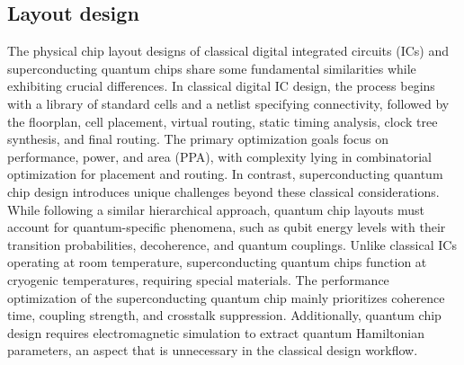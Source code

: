 \documentclass[a4paper,onecolumn,11pt,unpublished]{quantumarticle}
\begin{document}
\subsection{Layout design}
The physical chip layout designs of classical digital integrated circuits (ICs) and superconducting quantum chips share some fundamental similarities while exhibiting crucial differences. In classical digital IC design, the process begins with a library of standard cells and a netlist specifying connectivity, followed by the floorplan, cell placement, virtual routing, static timing analysis, clock tree synthesis, and final routing. The primary optimization goals focus on performance, power, and area (PPA), with complexity lying in combinatorial optimization for placement and routing. In contrast, superconducting quantum chip design introduces unique challenges beyond these classical considerations. While following a similar hierarchical approach, quantum chip layouts must account for quantum-specific phenomena, such as qubit energy levels with their transition probabilities, decoherence, and quantum couplings. Unlike classical ICs operating at room temperature, superconducting quantum chips function at cryogenic temperatures, requiring special materials. The performance optimization of the superconducting quantum chip mainly prioritizes coherence time, coupling strength, and crosstalk suppression. Additionally, quantum chip design requires electromagnetic simulation to extract quantum Hamiltonian parameters, an aspect that is unnecessary in the classical design workflow.
\end{document}

